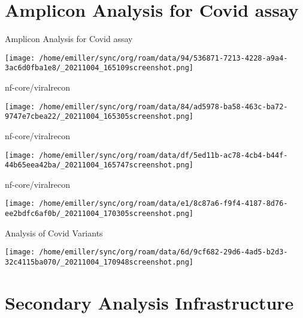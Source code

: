 \documentclass[bigger]{beamer}
\begin{document}
\section{Amplicon Analysis for Covid assay}
\label{sec:orgc69a70b}
\begin{frame}[label={sec:org89ee4af}]{Amplicon Analysis for Covid assay}
\begin{center}
\texttt{[image: /home/emiller/sync/org/roam/data/94/536871-7213-4228-a9a4-3ac6d0fba1e8/\_20211004\_165109screenshot.png]}
\end{center}
\end{frame}

\begin{frame}[label={sec:org1a14953}]{nf-core/viralrecon}
\begin{center}
\texttt{[image: /home/emiller/sync/org/roam/data/84/ad5978-ba58-463c-ba72-9747e7cbea22/\_20211004\_165305screenshot.png]}
\end{center}
\end{frame}

\begin{frame}[label={sec:org34e0721}]{nf-core/viralrecon}
\begin{center}
\texttt{[image: /home/emiller/sync/org/roam/data/df/5ed11b-ac78-4cb4-b44f-44b65eea42ba/\_20211004\_165747screenshot.png]}
\end{center}
\end{frame}

\begin{frame}[label={sec:orgcdb020f}]{nf-core/viralrecon}
\begin{center}
\texttt{[image: /home/emiller/sync/org/roam/data/e1/8c87a6-f9f4-4187-8d76-ee2bdfc6af0b/\_20211004\_170305screenshot.png]}
\end{center}
\end{frame}


\begin{frame}[label={sec:org5f233a6}]{Analysis of Covid Variants}
\begin{center}
\texttt{[image: /home/emiller/sync/org/roam/data/6d/9cf682-29d6-4ad5-b2d3-32c4115ba070/\_20211004\_170948screenshot.png]}
\end{center}
\end{frame}

\section{Secondary Analysis Infrastructure}
\label{sec:orgb0e3f13}
\end{document}

